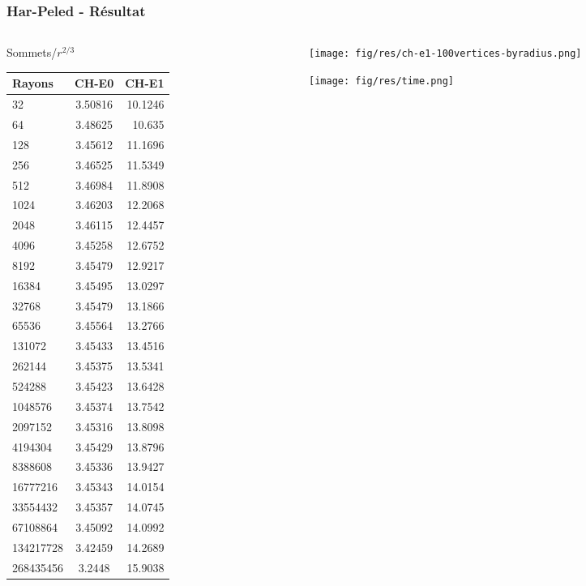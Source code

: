 \begin{frame}
  \frametitle{Har-Peled - Résultat}
	\begin{columns}[t]
 		\begin{column}{3.8cm}
  		\begin{block}{Sommets/$r^{2/3}$}
				\begin{tiny}
					\begin{tabular}{|l|c|r|}
						\hline
						Rayons & CH-E0 & CH-E1 \\
						\hline
						32 & 3.50816 & 10.1246 \\
						64 & 3.48625 & 10.635 \\
						128 & 3.45612 & 11.1696 \\
						256 & 3.46525 & 11.5349 \\
						512 & 3.46984 & 11.8908 \\
						1024 & 3.46203 & 12.2068 \\
						2048 & 3.46115 & 12.4457 \\
						4096 & 3.45258 & 12.6752 \\
						8192 & 3.45479 & 12.9217 \\
						16384 & 3.45495 & 13.0297 \\
						32768 & 3.45479 & 13.1866 \\
						65536 & 3.45564 & 13.2766 \\
						131072 & 3.45433 & 13.4516 \\
						262144 & 3.45375 & 13.5341 \\
						524288 & 3.45423 & 13.6428 \\
						1048576 & 3.45374 & 13.7542 \\
						2097152 & 3.45316 & 13.8098 \\
						4194304 & 3.45429 & 13.8796 \\
						8388608 & 3.45336 & 13.9427 \\
						16777216 & 3.45343 & 14.0154 \\
						33554432 & 3.45357 & 14.0745 \\
						67108864 & 3.45092 & 14.0992 \\
						134217728 & 3.42459 & 14.2689 \\
						268435456 & 3.2448 & 15.9038 \\
					  \hline
					\end{tabular}  
				\end{tiny}
			\end{block} 
		\end{column}
		\begin{column}{7cm}
		    \only<1>
		    {
				  \begin{figure}[h!]
					  \centering
				    \texttt{[image: fig/res/ch-e1-100vertices-byradius.png]}
			   	\end{figure}    
        }
		    {
				  \begin{figure}[h!]
					  \centering
				    \texttt{[image: fig/res/time.png]}
			   	\end{figure}    
        }
		\end{column}
	\end{columns} 

\end{frame}



